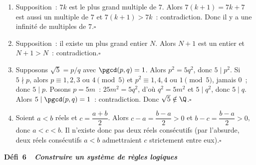 \begin{enumerate}
  \item Supposition~: $7k$ est le plus grand multiple de $7$.
        Alors $7(k+1)=7k+7$ est aussi un multiple de $7$ et $7(k+1)>7k$~: contradiction.
        Donc il y a une infinit\'e de multiples de $7$.\hfill$\square$
  \item Supposition~: il existe un plus grand entier $N$.
        Alors $N+1$ est un entier et $N+1>N$~: contradiction.\hfill$\square$
  \item Supposons $\sqrt{5}=p/q$ avec $\pgcd(p,q)=1$. Alors $p^2=5q^2$, donc $5\mid p^2$.
        Si $5\nmid p$, alors $p\equiv1,2,3$ ou $4\pmod5$ et $p^2\equiv1,4,4$ ou $1\pmod5$, jamais $0$~;
        donc $5\mid p$. Posons $p=5m$~: $25m^2=5q^2$, d'o\`u $q^2=5m^2$ et $5\mid q^2$, donc $5\mid q$.
        Alors $5\mid\pgcd(p,q)=1$~: contradiction. Donc $\sqrt{5}\notin\Q$.\hfill$\square$
  \item Soient $a<b$ r\'eels et $c=\dfrac{a+b}{2}$. Alors $c-a=\dfrac{b-a}{2}>0$ et
        $b-c=\dfrac{b-a}{2}>0$, donc $a<c<b$. Il n'existe donc pas deux r\'eels cons\'ecutifs
        (par l'absurde, deux r\'eels cons\'ecutifs $a<b$ admettraient $c$ strictement entre eux).\hfill$\square$
\end{enumerate}

\noindent{}
{\color{BO}\bfseries\small D\'efi~6~\textendash\ \textit{Construire un syst\`eme de r\`egles logiques}}
\par\smallskip

